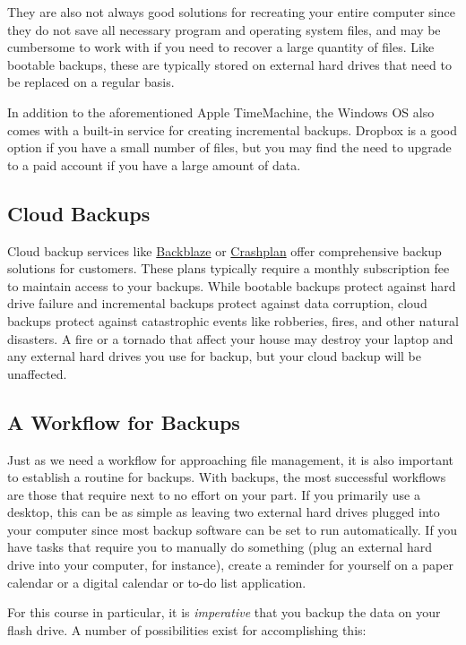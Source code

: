 \documentclass[]{book}
\begin{document}
They are also not always good solutions for recreating your entire
computer since they do not save all necessary program and operating
system files, and may be cumbersome to work with if you need to recover
a large quantity of files. Like bootable backups, these are typically
stored on external hard drives that need to be replaced on a regular
basis.

In addition to the aforementioned Apple TimeMachine, the Windows OS also
comes with a built-in service for creating incremental backups. Dropbox
is a good option if you have a small number of files, but you may find
the need to upgrade to a paid account if you have a large amount of
data.

\subsection{Cloud Backups}\label{cloud-backups}

Cloud backup services like \href{https://www.backblaze.com}{Backblaze}
or \href{https://www.code42.com/crashplan/}{Crashplan} offer
comprehensive backup solutions for customers. These plans typically
require a monthly subscription fee to maintain access to your backups.
While bootable backups protect against hard drive failure and
incremental backups protect against data corruption, cloud backups
protect against catastrophic events like robberies, fires, and other
natural disasters. A fire or a tornado that affect your house may
destroy your laptop and any external hard drives you use for backup, but
your cloud backup will be unaffected.

\subsection{A Workflow for Backups}\label{a-workflow-for-backups}

Just as we need a workflow for approaching file management, it is also
important to establish a routine for backups. With backups, the most
successful workflows are those that require next to no effort on your
part. If you primarily use a desktop, this can be as simple as leaving
two external hard drives plugged into your computer since most backup
software can be set to run automatically. If you have tasks that require
you to manually do something (plug an external hard drive into your
computer, for instance), create a reminder for yourself on a paper
calendar or a digital calendar or to-do list application.

For this course in particular, it is \emph{imperative} that you backup
the data on your flash drive. A number of possibilities exist for
accomplishing this:
\end{document}
